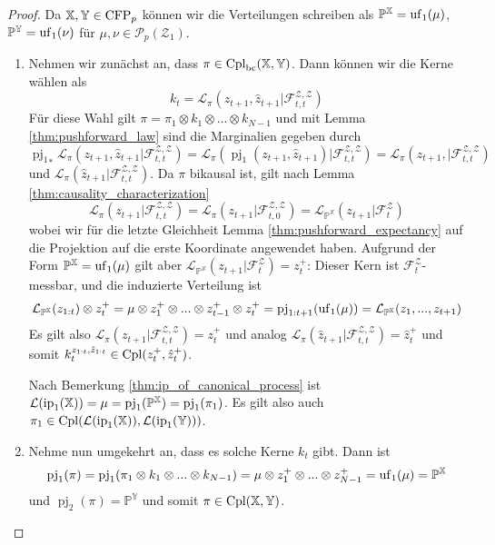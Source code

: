 \begin{proof}
Da $\mathbb{X}, \mathbb{Y} \in \operatorname{CFP}_p$ können wir die Verteilungen schreiben als $\mathbb{P}^{\mathbb{X}} = \operatorname{uf}_1(\mu)$, $\mathbb{P}^{\mathbb{Y}}=\operatorname{uf}_1(\nu)$ für $\mu, \nu \in \mathcal{P}_p(\mathcal{Z}_1)$.
\begin{enumerate}
\item
Nehmen wir zunächst an, dass $\pi \in \operatorname{Cpl}_{\operatorname{bc}}(\mathbb{X}, \mathbb{Y})$. Dann können wir die Kerne wählen als 
$$k_t = \mathcal{L}_\pi(z_{t+1}, \hat{z}_{t+1} \vert \mathcal{F}_{t,t}^{\mathcal{Z}, \mathcal{Z}})$$
Für diese Wahl gilt $\pi = \pi_1 \otimes k_1 \otimes ... \otimes k_{N-1}$ und mit Lemma \ref{thm:pushforward_law} sind die Marginalien gegeben durch 
$${\operatorname{pj}_1}_*\mathcal{L}_\pi(z_{t+1}, \hat{z}_{t+1} \vert \mathcal{F}_{t,t}^{\mathcal{Z}, \mathcal{Z}}) = \mathcal{L}_\pi(\operatorname{pj}_1(z_{t+1}, \hat{z}_{t+1}) \vert \mathcal{F}_{t,t}^{\mathcal{Z}, \mathcal{Z}}) = \mathcal{L}_\pi(z_{t+1},  \vert \mathcal{F}_{t,t}^{\mathcal{Z}, \mathcal{Z}})$$
und $\mathcal{L}_\pi(\hat{z}_{t+1} \vert \mathcal{F}_{t,t}^{\mathcal{Z},\mathcal{Z}})$. Da $\pi$ bikausal ist, gilt nach Lemma \ref{thm:causality_characterization} 
$$\mathcal{L}_\pi(z_{t+1} \vert \mathcal{F}_{t,t}^{\mathcal{Z,Z}}) = \mathcal{L}_\pi(z_{t+1} \vert \mathcal{F}_{t,0}^{\mathcal{Z,Z}})=\mathcal{L}_{\mathbb{P}^{\mathbb{X}}}(z_{t+1} \vert \mathcal{F}_t^\mathcal{Z})$$
wobei wir für die letzte Gleichheit Lemma \ref{thm:pushforward_expectancy} auf die Projektion auf die erste Koordinate angewendet haben. Aufgrund der Form $\mathbb{P}^{\mathbb{X}} = \operatorname{uf}_1(\mu)$ gilt aber $\mathcal{L}_{\mathbb{P}^{\mathbb{X}}}(z_{t+1} \vert \mathcal{F}_t^{\mathcal{Z}}) = z_t^+$: Dieser Kern ist $\mathcal{F}_t^{\mathcal{Z}}$-messbar, und die induzierte Verteilung ist 
$$\mathcal{L}_{\mathbb{P}^{\mathbb{X}}}(z_{1:t}) \otimes z_t^+ = \mu \otimes z_1^+ \otimes ... \otimes z_{t-1}^+  \otimes z_t^+ = \operatorname{pj}_{1:t+1}(\operatorname{uf}_1(\mu)) = \mathcal{L}_{\mathbb{P}^{\mathbb{X}}}(z_1,...,z_{t+1})$$
Es gilt also $\mathcal{L}_\pi(z_{t+1} \vert \mathcal{F}_{t,t}^{\mathcal{Z,Z}}) = z_t^+$ und analog $\mathcal{L}_\pi(\hat{z}_{t+1} \vert \mathcal{F}_{t,t}^{\mathcal{Z,Z}}) = \hat{z}_t^+$ und somit $k_t^{z_{1:t}, \hat{z}_{1:t}} \in \operatorname{Cpl}(z_t^+, \hat{z}_t^+)$.

Nach Bemerkung \ref{thm:ip_of_canonical_process} ist $\mathcal{L}(\operatorname{ip}_1(\mathbb{X})) = \mu = \operatorname{pj}_1(\mathbb{P}^\mathbb{X}) = \operatorname{pj}_1(\pi_1)$. Es gilt also auch $\pi_1 \in \operatorname{Cpl}(\mathcal{L}(\operatorname{ip}_1(\mathbb{X})), \mathcal{L}(\operatorname{ip}_1(\mathbb{Y})))$.
\item
Nehme nun umgekehrt an, dass es solche Kerne $k_t$ gibt. Dann ist 
$$\operatorname{pj}_1(\pi) = \operatorname{pj}_1(\pi_1 \otimes k_1 \otimes ... \otimes k_{N-1}) = \mu \otimes z_1^+ \otimes ... \otimes z_{N-1}^+ = \operatorname{uf}_1(\mu) = \mathbb{P}^\mathbb{X}$$
und $\operatorname{pj}_2(\pi) = \mathbb{P}^\mathbb{Y}$ und somit $\pi \in \operatorname{Cpl}(\mathbb{X}, \mathbb{Y})$. 


\end{enumerate}
\end{proof}
